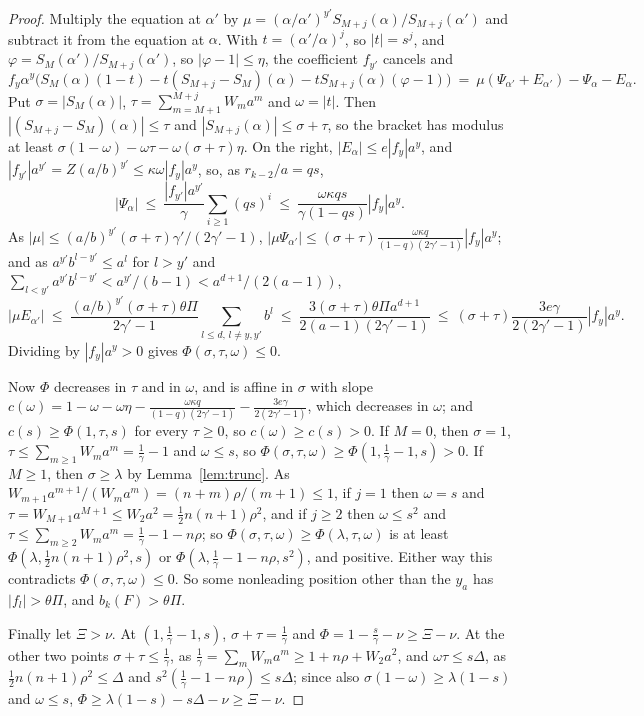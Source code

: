 \documentclass[11pt]{article}
\begin{document}
\begin{proof}
Multiply the equation at $\alpha'$ by
$\mu=(\alpha/\alpha')^{y'}S_{M+j}(\alpha)/S_{M+j}(\alpha')$ and subtract it
from the equation at $\alpha$.  With $t=(\alpha'/\alpha)^j$, so $|t|=s^j$,
and $\varphi=S_M(\alpha')/S_{M+j}(\alpha')$, so $|\varphi-1|\le\eta$, the
coefficient $f_{y'}$ cancels and
\[
  f_y\alpha^y\bigl(S_M(\alpha)(1-t)-t(S_{M+j}-S_M)(\alpha)-tS_{M+j}(\alpha)(\varphi-1)\bigr)
  \ =\ \mu(\Psi_{\alpha'}+E_{\alpha'})-\Psi_\alpha-E_\alpha .
\]
Put $\sigma=|S_M(\alpha)|$, $\tau=\sum_{m=M+1}^{M+j}W_ma^m$ and
$\omega=|t|$.  Then $|(S_{M+j}-S_M)(\alpha)|\le\tau$ and
$|S_{M+j}(\alpha)|\le\sigma+\tau$, so the bracket has modulus at least
$\sigma(1-\omega)-\omega\tau-\omega(\sigma+\tau)\eta$.  On the right,
$|E_\alpha|\le e|f_y|a^y$, and
$|f_{y'}|a^{y'}=Z(a/b)^{y'}\le\kappa\omega|f_y|a^y$, so, as
$r_{k-2}/a=qs$,
\[
  |\Psi_\alpha|\ \le\ \frac{|f_{y'}|a^{y'}}\gamma\sum_{i\ge1}(qs)^i
  \ \le\ \frac{\omega\kappa qs}{\gamma(1-qs)}|f_y|a^y .
\]
As $|\mu|\le(a/b)^{y'}(\sigma+\tau)\gamma'/(2\gamma'-1)$,
$|\mu\Psi_{\alpha'}|\le(\sigma+\tau)\frac{\omega\kappa q}{(1-q)(2\gamma'-1)}|f_y|a^y$; and as
$a^{y'}b^{l-y'}\le a^l$ for $l>y'$ and $\sum_{l<y'}a^{y'}b^{l-y'}<a^{y'}/(b-1)<a^{d+1}/(2(a-1))$,
\[
  |\mu E_{\alpha'}|\ \le\ \frac{(a/b)^{y'}(\sigma+\tau)\theta\Pi}{2\gamma'-1}\sum_{l\le d,\,l\ne y,y'}b^l
  \ \le\ \frac{3(\sigma+\tau)\theta\Pi a^{d+1}}{2(a-1)(2\gamma'-1)}
  \ \le\ (\sigma+\tau)\frac{3e\gamma}{2(2\gamma'-1)}|f_y|a^y .
\]
Dividing by $|f_y|a^y>0$ gives $\Phi(\sigma,\tau,\omega)\le0$.

Now $\Phi$ decreases in $\tau$ and in $\omega$, and is affine in $\sigma$ with
slope
$c(\omega)=1-\omega-\omega\eta-\frac{\omega\kappa q}{(1-q)(2\gamma'-1)}-\frac{3e\gamma}{2(2\gamma'-1)}$,
which decreases in $\omega$; and $c(s)\ge\Phi(1,\tau,s)$ for every
$\tau\ge0$, so $c(\omega)\ge c(s)>0$.  If $M=0$, then $\sigma=1$,
$\tau\le\sum_{m\ge1}W_ma^m=\frac1\gamma-1$ and $\omega\le s$, so
$\Phi(\sigma,\tau,\omega)\ge\Phi(1,\frac1\gamma-1,s)>0$.  If $M\ge1$, then
$\sigma\ge\lambda$ by Lemma~\ref{lem:trunc}.  As
$W_{m+1}a^{m+1}/(W_ma^m)=(n+m)\rho/(m+1)\le1$, if $j=1$ then $\omega=s$ and
$\tau=W_{M+1}a^{M+1}\le W_2a^2=\frac12n(n+1)\rho^2$, and if $j\ge2$ then
$\omega\le s^2$ and $\tau\le\sum_{m\ge2}W_ma^m=\frac1\gamma-1-n\rho$; so
$\Phi(\sigma,\tau,\omega)\ge\Phi(\lambda,\tau,\omega)$ is at least
$\Phi(\lambda,\frac12n(n+1)\rho^2,s)$ or
$\Phi(\lambda,\frac1\gamma-1-n\rho,s^2)$, and positive.  Either way this
contradicts $\Phi(\sigma,\tau,\omega)\le0$.  So some nonleading position
other than the $y_a$ has $|f_l|>\theta\Pi$, and $b_k(F)>\theta\Pi$.

Finally let $\Xi>\nu$.  At $(1,\frac1\gamma-1,s)$, $\sigma+\tau=\frac1\gamma$
and $\Phi=1-\frac s\gamma-\nu\ge\Xi-\nu$.  At the other two points
$\sigma+\tau\le\frac1\gamma$, as
$\frac1\gamma=\sum_mW_ma^m\ge1+n\rho+W_2a^2$, and $\omega\tau\le s\Delta$,
as $\frac12n(n+1)\rho^2\le\Delta$ and
$s^2(\frac1\gamma-1-n\rho)\le s\Delta$; since also
$\sigma(1-\omega)\ge\lambda(1-s)$ and $\omega\le s$,
$\Phi\ge\lambda(1-s)-s\Delta-\nu\ge\Xi-\nu$.
\end{proof}
\end{document}
